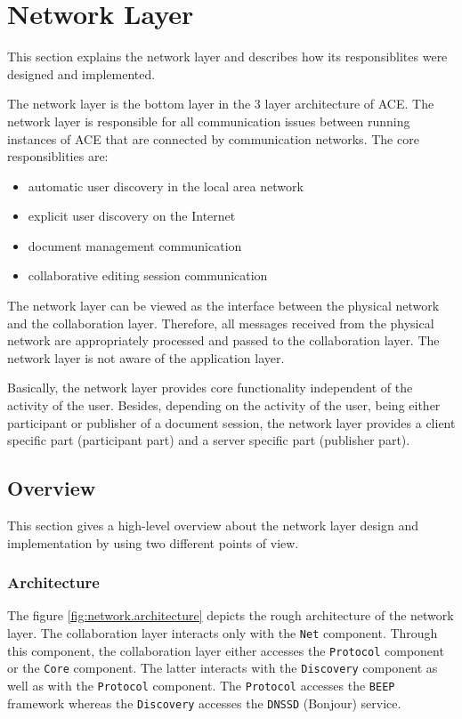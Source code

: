 \chapter{Network Layer}
\label{chapter:networklayer}

This section explains the network layer and describes how its responsiblites were designed and implemented.

The network layer is the bottom layer in the 3 layer architecture of ACE. The network layer is responsible for all communication issues between running instances of ACE that are connected by communication networks. The core responsiblities are:

\begin{itemize}
 \item automatic user discovery in the local area network
 \item explicit user discovery on the Internet
 \item document management communication
 \item collaborative editing session communication
\end{itemize}

The network layer can be viewed as the interface between the physical network and the collaboration layer. Therefore, all messages received from the physical network are appropriately processed and passed to the collaboration layer. The network layer is not aware of the application layer.

Basically, the network layer provides core functionality independent of the activity of the user. Besides, depending on the activity of the user, being either participant or publisher of a document session, the network layer provides a client specific part (participant part) and a server specific part (publisher part).


\section{Overview}

This section gives a high-level overview about the network layer design and implementation by using two different points of view.

\subsection{Architecture}

The figure \ref{fig:network.architecture} depicts the rough architecture of the network layer. The collaboration layer interacts only with the \texttt{Net} component. Through this component, the collaboration layer either accesses the \texttt{Protocol} component or the \texttt{Core} component. The latter interacts with the \texttt{Discovery} component as well as with the \texttt{Protocol} component. The \texttt{Protocol} accesses the \texttt{BEEP} framework whereas the \texttt{Discovery} accesses the \texttt{DNSSD} (Bonjour) service.

